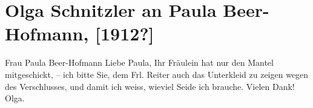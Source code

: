 

         
         \renewcommand{\erwaehntePersonen}{Personen: Paula Beer-Hofmann, Maria Anna Cerino, Anna Reiter}
         \renewcommand{\erwaehnteOrte}{Orte: Wien}
         \renewcommand{\erwaehnteWerke}{}
               \section[Olga Schnitzler an Paula Beer-Hofmann, {[}1912?{]}]{ Olga Schnitzler an Paula Beer-Hofmann, {[}1912?{]}}\nopagebreak{}\rehead{ }\begin{ledgroupsized}[t]{13cm}\normalsize\beginnumbering \toendnotes[C]{\smallbreak\pagebreak[2]} 
\toendnotes[C]{\smallbreak}\pstart{}{\pb}Frau Paula Beer-Hofmann\pend{}{\bigskip}\pstart
           \noindent{}{\pb}Liebe Paula, Ihr Fräulein hat nur den Mantel
               mitgeschickt, – ich bitte Sie, dem Frl. Reiter
               auch das Unterkleid zu zeigen wegen des Verschlusses, und damit ich weiss, wieviel
               Seide {\pb}ich brauche.\pend
           \pstart
           Vielen Dank!\pend
           \pstart \spacefill\mbox{Olga.}\pend{}
         
         \endnumbering{}\end{ledgroupsized}  \newcommand{\dateiname}{L02566}\newcommand{\titel}{Olga Schnitzler an Paula Beer-Hofmann, [1912?]}\newcommand{\editorInnen}{Martin Anton Müller und Gerd-Hermann Susen}
      